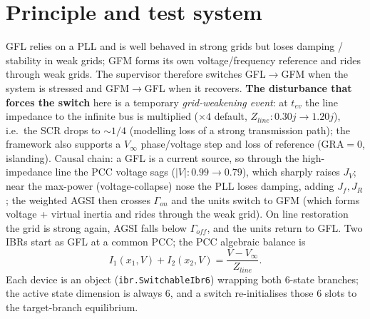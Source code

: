 \documentclass[12pt,a4paper]{article}
\begin{document}
\section{Principle and test system}
GFL relies on a PLL and is well behaved in strong grids but loses damping / stability in weak grids;
GFM forms its own voltage/frequency reference and rides through weak grids. The supervisor therefore
switches GFL$\to$GFM when the system is stressed and GFM$\to$GFL when it recovers. \textbf{The disturbance
that forces the switch} here is a temporary \emph{grid-weakening event}: at $t_{ev}$ the line impedance to
the infinite bus is multiplied ($\times4$ default, $Z_{line}:0.30j\!\to\!1.20j$), i.e.\ the SCR drops to
$\sim1/4$ (modelling loss of a strong transmission path); the framework also supports a $V_\infty$
phase/voltage step and loss of reference ($\mathrm{GRA}=0$, islanding). Causal chain: a GFL is a current
source, so through the high-impedance line the PCC voltage sags ($|V|:0.99\!\to\!0.79$), which sharply
raises $J_V$; near the max-power (voltage-collapse) nose the PLL loses damping, adding $J_f,J_R$; the
weighted AGSI then crosses $\Gamma_{on}$ and the units switch to GFM (which forms voltage + virtual
inertia and rides through the weak grid). On line restoration the grid is strong again, AGSI falls below
$\Gamma_{off}$, and the units return to GFL. Two IBRs start as GFL
at a common PCC; the PCC algebraic balance is
\begin{equation}
I_1(x_1,V) + I_2(x_2,V) = \frac{V - V_\infty}{Z_{line}}.
\end{equation}
Each device is an object (\texttt{ibr.SwitchableIbr6}) wrapping both 6-state branches; the active state
dimension is always 6, and a switch re-initialises those 6 slots to the target-branch equilibrium.
\end{document}
